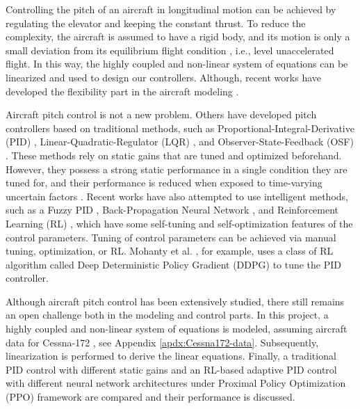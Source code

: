 \documentclass[lettersize,journal]{IEEEtran}
\begin{document}
Controlling the pitch of an aircraft in longitudinal motion can be achieved by regulating the elevator and keeping the constant thrust. To reduce the complexity, the aircraft is assumed to have a rigid body, and its motion is only a small deviation from its equilibrium flight condition \cite{ref2}, i.e., level unaccelerated flight. In this way, the highly coupled and non-linear system of equations can be linearized and used to design our controllers. Although, recent works have developed the flexibility part in the aircraft modeling \cite{ref3}.

Aircraft pitch control is not a new problem. Others have developed pitch controllers based on traditional methods, such as Proportional-Integral-Derivative (PID) \cite{ref4}, Linear-Quadratic-Regulator (LQR) \cite{ref5}, and Observer-State-Feedback (OSF) \cite{ref6}. These methods rely on static gains that are tuned and optimized beforehand. However, they possess a strong static performance in a single condition they are tuned for, and their performance is reduced when exposed to time-varying uncertain factors \cite{ref7}. Recent works have also attempted to use intelligent methods, such as a Fuzzy PID \cite{ref8}, Back-Propagation Neural Network \cite{ref9}, and Reinforcement Learning (RL) \cite{ref7,ref10}, which have some self-tuning and self-optimization features of the control parameters. Tuning of control parameters can be achieved via manual tuning, optimization, or RL. Mohanty et al. \cite{ref7}, for example, uses a class of RL algorithm called Deep Deterministic Policy Gradient (DDPG) \cite{ref11} to tune the PID controller.

Although aircraft pitch control has been extensively studied, there still remains an open challenge both in the modeling and control parts. In this project, a highly coupled and non-linear system of equations is modeled, assuming aircraft data for Cessna-172 \cite{ref12}, see Appendix \ref{apdx:Cessna172-data}. Subsequently, linearization is performed to derive the linear equations. Finally, a traditional PID control with different static gains and an RL-based adaptive PID control with different neural network architectures under Proximal Policy Optimization (PPO) \cite{ref13} framework are compared and their performance is discussed.
\end{document}
